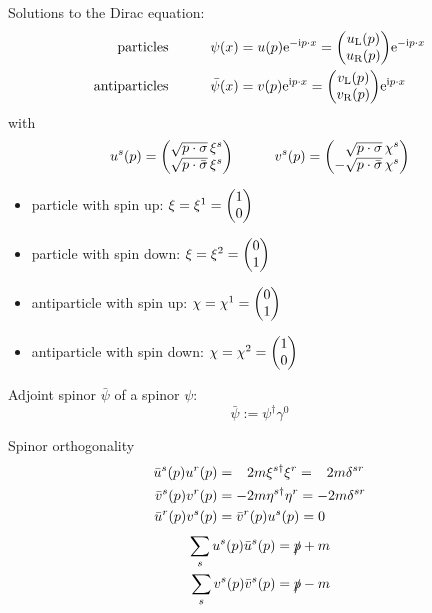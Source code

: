 			\noindent
			Solutions to the Dirac equation:
			\begin{equation}
				\begin{aligned}
					\text{particles} & \hsp
					\psi(x) = u(p) \ex^{-\i p \cdot x} = \mqty(
						u_\text{L}(p) \\
						u_\text{R}(p)
						) \ex^{-\i p \cdot x} \\
					\text{antiparticles} & \hsp
					\bar{\psi}(x) = v(p) \ex^{\i p \cdot x} = \mqty(
						v_\text{L}(p) \\
						v_\text{R}(p)
						) \ex^{\i p \cdot x}
				\end{aligned}
			\end{equation}
			with
			\begin{equation}
				u^s(p) = \mqty(
					\sqrt{p\cdot\sigma}\,\xi^s \\
					\sqrt{p\cdot\bar{\sigma}}\,\xi^s
					)
				\hsp v^s(p) = \mqty(
					\M\sqrt{p\cdot\sigma}\,\chi^s \\
					-\sqrt{p\cdot\bar{\sigma}}\,\chi^s
				)
			\end{equation}
			\begin{itemize}
				\item particle with spin up: $\xi=\xi^1=\mqty(1\\0)$
				\item particle with spin down: $\xi=\xi^2=\mqty(0\\1)$
				\item antiparticle with spin up: $\chi=\chi^1=\mqty(0\\1)$
				\item antiparticle with spin down: $\chi=\chi^2=\mqty(1\\0)$
			\end{itemize}

			\noindent
			Adjoint spinor $\bar{\psi}$ of a spinor $\psi$:
			\begin{equation}
				\bar{\psi} := \psi^{\dagger} \gamma^0
			\end{equation}

			\noindent
			Spinor orthogonality
			\begin{equation}
				\begin{aligned}
					\bar{u}^s(p) u^r(p) &= \M 2m\xi^{s\dagger}\xi^r = \M 2m\delta^{sr} \\
					\bar{v}^s(p) v^r(p) &= - 2m\eta^{s\dagger}\eta^r = - 2m\delta^{sr} \\
					\bar{u}^r(p) v^s(p) &= \bar{v}^r(p) u^s(p) = 0
				\end{aligned}
			\end{equation}
			\begin{equation}
				\begin{aligned}
					\sum_s u^s(p) \bar{u}^s(p) &= \slashed{p} + m \\
					\sum_s v^s(p) \bar{v}^s(p) &= \slashed{p} - m
				\end{aligned}
			\end{equation}

